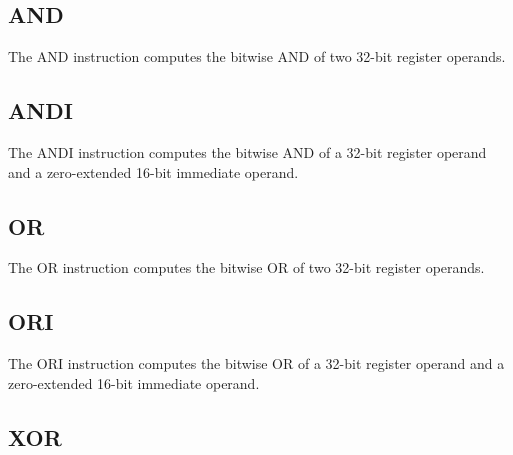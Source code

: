 \begin{effectize}
\idivzero
{}
\end{effectize}

\subsection{AND}

The AND instruction computes the bitwise AND of two 32-bit register operands.\\



\subsection{ANDI}

The ANDI instruction computes the bitwise AND of a 32-bit register operand and a zero-extended 16-bit immediate operand.\\



\subsection{OR}

The OR instruction computes the bitwise OR of two 32-bit register operands.\\



\subsection{ORI}

The ORI instruction computes the bitwise OR of a 32-bit register operand and a zero-extended 16-bit immediate operand.\\



\subsection{XOR}

